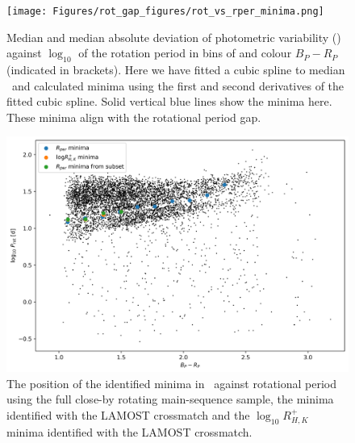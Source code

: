 \begin{figure}
\centering
  \texttt{[image: Figures/rot\_gap\_figures/rot\_vs\_rper\_minima.png]}
  \caption[Median and median absolute deviation of photometric variability (\rper{}) against $\log_{10}$ of the rotation period in bins of and colour \gaia{} $B_P-R_P$.]{
  Median and median absolute deviation of photometric variability (\rper{}) against $\log_{10}$ of the rotation period in bins of and colour \gaia{} $B_P-R_P$ (indicated in brackets). Here we have fitted a cubic spline to median \rper{} \ and calculated minima using the first and second derivatives of the fitted cubic spline. Solid vertical blue lines show the minima here. These minima align with the rotational period gap.}
  \label{fig:binned_rper_scatter}
\end{figure}

\begin{figure}
\centering
  \includegraphics[width=\textwidth]{Figures/rot_gap_figures/rot_dist_minima_shown.png}
  \caption[The position of the identified minima in \rper{} \ against rotational period using the full close-by rotating main-sequence \kepler{} sample, the \rper{} minima identified with the \kepler{} LAMOST crossmatch and the $\log_{10} R^{+}_{H,K}$ minima identified with the \kepler{} LAMOST crossmatch.]{
  The position of the identified minima in \rper{} \ against rotational period using the full close-by rotating main-sequence \kepler{} sample, the \rper{} minima identified with the \kepler{} LAMOST crossmatch and the $\log_{10} R^{+}_{H,K}$ minima identified with the \kepler{} LAMOST crossmatch.}
  \label{fig:indicating_minima}
\end{figure}

